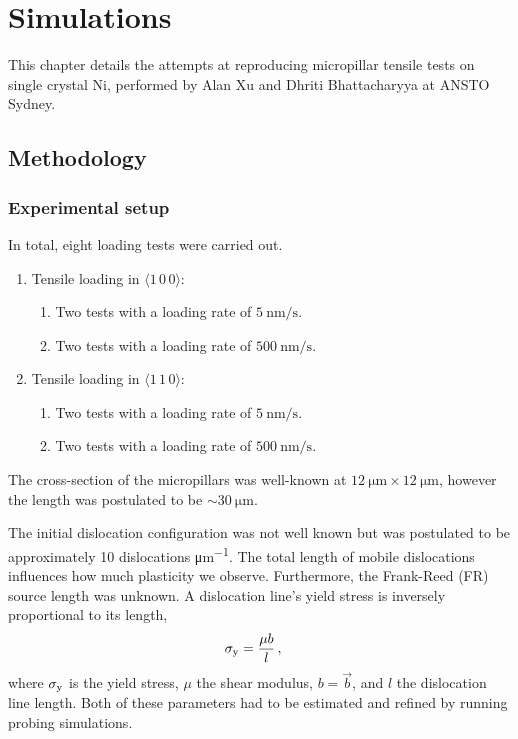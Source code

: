 \chapter{Simulations}\label{c:simulations}

This chapter details the attempts at reproducing micropillar tensile tests on single crystal Ni, performed by Alan Xu and Dhriti Bhattacharyya at ANSTO Sydney.

\section{Methodology}

\subsection{Experimental setup}
\label{ss:experimentalSetup}

In total, eight loading tests were carried out.
\begin{enumerate}
    \item Tensile loading in $\langle 1\, 0\, 0 \rangle$:
          \begin{enumerate}
              \item Two tests with a loading rate of $\SI{5}{\nano\metre\per\second}$.
              \item Two tests with a loading rate of $\SI{500}{\nano\metre\per\second}$.
          \end{enumerate}
    \item Tensile loading in $\langle 1\, 1\, 0 \rangle$:
          \begin{enumerate}
              \item Two tests with a loading rate of $\SI{5}{\nano\metre\per\second}$.
              \item Two tests with a loading rate of $\SI{500}{\nano\metre\per\second}$.
          \end{enumerate}
\end{enumerate}

The cross-section of the micropillars was well-known at $\SI{12}{\micro\metre} \times \SI{12}{\micro\metre}$, however the length was postulated to be $\sim \SI{30}{\micro\metre}$.

The initial dislocation configuration was not well known but was postulated to be approximately 10 dislocations \si{\micro\metre^{-1}}. The total length of mobile dislocations influences how much plasticity we observe. Furthermore, the Frank-Reed (FR) source length was unknown. A dislocation line's yield stress is inversely proportional to its length,
\begin{align}\label{eq:yieldStress}
    \sigma_{\textrm{y}} & = \dfrac{\mu b}{l}\,,
\end{align}
where $\sigma_{\textrm{y}}$ is the yield stress, $\mu$ the shear modulus, $b =  \vec{b} $, and $l$ the dislocation line length. Both of these parameters had to be estimated and refined by running probing simulations.

